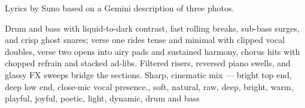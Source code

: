 

\begin{notes}
Lyrics by Suno based on a Gemini description of three photos.
\end{notes}

\begin{style}
Drum and bass with liquid-to-dark contrast, fast rolling breaks, sub-bass surges, and crisp ghost snares; verse one rides tense and minimal with clipped vocal doubles, verse two opens into airy pads and sustained harmony, chorus hits with chopped refrain and stacked ad-libs. %
Filtered risers, reversed piano swells, and glassy FX sweeps bridge the sections. %
Sharp, cinematic mix — bright top end, deep low end, close-mic vocal presence., soft, natural, raw, deep, bright, warm, playful, joyful, poetic, light, dynamic, drum and bass
\end{style}

